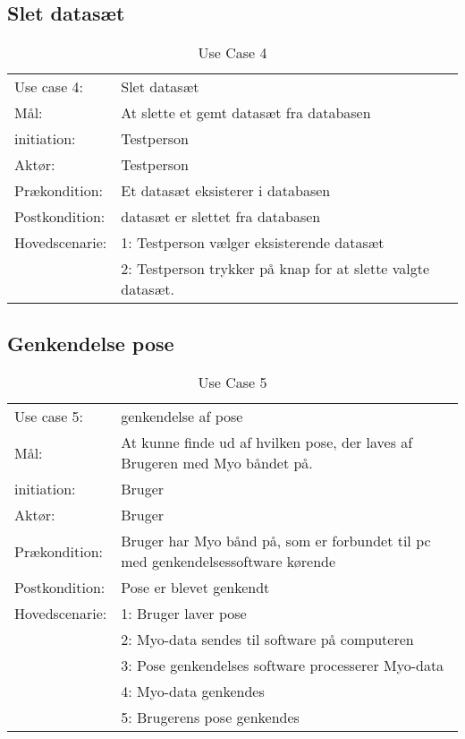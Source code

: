\subsection{Slet datasæt}
\begin{center}
	\begin{table}[htbp]
		\begin{tabular}{lp{10cm}}
			\rowcolor{grey} Use case 4:	& Slet datasæt \\
			Mål:	& At slette et gemt datasæt fra databasen \\
			initiation:	& Testperson\\
			Aktør: & Testperson\\
			Prækondition: & Et datasæt eksisterer i databasen\\
			Postkondition: & datasæt er slettet fra databasen\\
			Hovedscenarie: & 1: Testperson vælger eksisterende datasæt\\
			& 2: Testperson trykker på knap for at slette valgte datasæt.
		\end{tabular}
		\caption{Use Case 4}
	\end{table}
\end{center}

\subsection{Genkendelse pose}
\begin{center}
	\begin{table}[htbp]
		\begin{tabular}{lp{10cm}}
			\rowcolor{grey} Use case 5:		& genkendelse af pose\\
			Mål: & At kunne finde ud af hvilken pose, der laves af Brugeren med Myo båndet på. \\
			initiation:	& Bruger \\
			Aktør: & Bruger\\
			Prækondition: & Bruger har Myo bånd på, som er forbundet til pc med genkendelsessoftware kørende \\
			Postkondition: & Pose er blevet genkendt \\
			Hovedscenarie: & 1: Bruger laver pose \\
			& 2: Myo-data sendes til software på computeren\\
			& 3: Pose genkendelses software processerer Myo-data\\
			& 4: Myo-data genkendes\\
			& 5: Brugerens pose genkendes\\
		\end{tabular}
		\caption{Use Case 5}
	\end{table}
\end{center}

